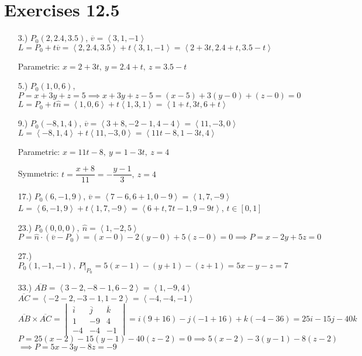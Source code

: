 \documentclass[12pt]{article}
\newcommand{\angleb}[1]{\left\langle#1\right\rangle}
\begin{document}
\section*{Exercises 12.5}
\begin{itemize}
	\item [3.)] $P_0(2,2.4,3.5)$, $\overline{v}=\angleb{3,1,-1}$\newline
	      $L=P_0+t\overline{v}=\angleb{2,2.4,3.5}+t\angleb{3,1,-1}=\angleb{2+3t,2.4+t,3.5-t}$

	      Parametric:\newline
	      $x=2+3t,\ y=2.4+t,\ z=3.5-t$

	\item [5.)] $P_0(1,0,6)$, $P=x+3y+z=5\implies x+3y+z-5=(x-5)+3(y-0)+(z-0)=0$\newline
	      $L=P_0+t\hat{n}=\angleb{1,0,6}+t\angleb{1,3,1}=\angleb{1+t,3t,6+t}$

	\item [9.)] $P_0(-8,1,4)$, $\overline{v}=\angleb{3+8,-2-1,4-4}=\angleb{11,-3,0}$\newline
	      $L=\angleb{-8,1,4}+t\angleb{11,-3,0}=\angleb{11t-8,1-3t,4}$

	      Parametric:\newline
	      $x=11t-8,\ y=1-3t,\ z=4$

	      Symmetric:\newline
	      $t=\dfrac{x+8}{11}=-\dfrac{y-1}{3},\ z=4$

	\item [17.)] $P_0(6,-1,9)$, $\overline{v}=\angleb{7-6,6+1,0-9}=\angleb{1,7,-9}$\newline
	      $L=\angleb{6,-1,9}+t\angleb{1,7,-9}=\angleb{6+t,7t-1,9-9t}$, $t\in[0,1]$

	\item [23.)] $P_0(0,0,0),\ \hat{n}=\angleb{1,-2,5}$\newline
	      $P=\hat{n}\cdot(\overline{v}-P_0)=(x-0)-2(y-0)+5(z-0)=0\implies P=x-2y+5z=0$\newline

	\item [27.)] $P_0(1,-1,-1),\ P\vert_{P_0}=5(x-1)-(y+1)-(z+1)=5x-y-z=7$

	\item [33.)] $\overline{AB}=\angleb{3-2,-8-1,6-2}=\angleb{1,-9,4}$\newline
	      $\overline{AC}=\angleb{-2-2,-3-1,1-2}=\angleb{-4,-4,-1}$\newline
	      $\overline{AB}\times\overline{AC}=\begin{vmatrix}
			      \overline{i} & \overline{j} & \overline{k} \\
			      1            & -9           & 4            \\-4 & -4 & -1
		      \end{vmatrix}=i(9+16)-j(-1+16)+k(-4-36)=25i-15j-40k$\newline
	      $P=25(x-2)-15(y-1)-40(z-2)=0\implies5(x-2)-3(y-1)-8(z-2)$\newline
	      $\implies P=5x-3y-8z=-9$


\end{itemize}
\end{document}

